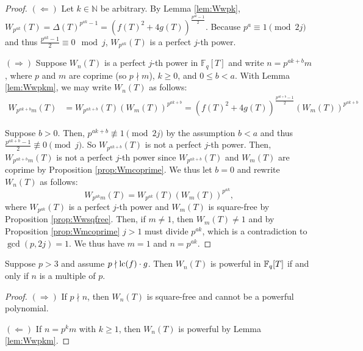 \begin{proof}
    $(\Leftarrow)$ Let $k \in \mathbb{N}$ be arbitrary. By Lemma \ref{lem:Wwpk}, $W_{p^{ak}}(T) = \Delta(T)^{p^{ak} - 1} = \left(f(T)^2 + 4 g(T) \right)^{\frac{p^{ak} - 1}{2}}$. Because $p^a \equiv 1 \pmod{2j}$ and thus $\frac{p^{ak} - 1}{2} \equiv 0 \mod j$, $W_{p^{ak}}(T)$ is a perfect $j$-th power.
    
    $(\Rightarrow)$ Suppose $W_n(T)$ is a perfect $j$-th power in $\mathbb{F}_q[T]$ and write $n = p^{ak + b}m$, where $p$ and $m$ are coprime (so $p \nmid m$), $k \geq 0$, and \(0 \le b < a\). With Lemma \ref{lem:Wwpkm}, we may write $W_n(T)$ as follows:
    \begin{align*}
        W_{p^{ak + b}m}(T) &= W_{p^{ak + b}}(T) \left(W_m(T)\right)^{p^{ak + b}} = \left(f(T)^2 + 4 g(T) \right)^{\frac{p^{ak +b} - 1}{2}} \left(W_m(T)\right)^{p^{ak + b}}
    \end{align*}

    Suppose $b > 0$. Then, $p^{ak + b} \not \equiv 1 \pmod{2j}$ by the assumption $b < a$ and thus $\frac{p^{ak + b} - 1}{2} \not \equiv 0 \pmod j$. So $W_{p^{ak + b}}(T)$ is not a perfect $j$-th power. Then, $W_{p^{ak + b}m}(T)$ is not a perfect $j$-th power since $W_{p^{ak + b}}(T)$ and $W_m(T)$ are coprime by Proposition \ref{prop:Wmcoprime}. We thus let $b = 0$ and rewrite $W_n(T)$ as follows: $$W_{p^{ak}m}(T) = W_{p^{ak}}(T) \left(W_m(T)\right)^{p^{ak}} \text{,}$$ where $W_{p^{ak}}(T)$ is a perfect $j$-th power and $W_m(T)$ is square-free by Proposition \ref{prop:Wwsqfree}. Then, if $m \neq 1$, then $W_m(T) \neq 1$ and by Proposition \ref{prop:Wmcoprime} $j > 1$ must divide $p^{ak}$, which is a contradiction to $\gcd(p,2j) = 1$. We thus have $m = 1$ and $n = p^{ak}$.
\end{proof}


\begin{theorem}
    \label{thm:Wn_powerful}
    Suppose $p > 3$ and assume $p \nmid \mathrm{lc}(f) \cdot g$.
    Then \(W_n(T)\) is powerful in \(\mathbb{F}_q[T]\) if and only if $n$ is a multiple of $p$.
\end{theorem}

\begin{proof}
    $(\Rightarrow)$ If $p \nmid n$, then $W_n(T)$ is square-free and cannot be a powerful polynomial.

    $(\Leftarrow)$ If $n = p^k m$ with $k \ge 1$, then $W_n(T)$ is powerful by Lemma \ref{lem:Wwpkm}.
\end{proof}

